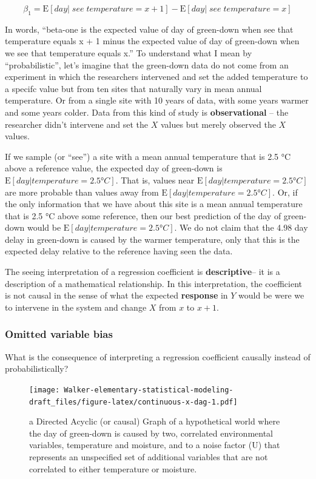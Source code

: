 \documentclass[]{book}
\begin{document}
\begin{equation}
\beta_1 = \textrm{E}[day|\;see\;temperature = x+1] - \textrm{E}[day|\;see \;temperature = x]
\end{equation}

In words, ``beta-one is the expected value of day of green-down when see that temperature equals x + 1 minus the expected value of day of green-down when we see that temperature equals x.'' To understand what I mean by ``probabilistic'', let's imagine that the green-down data do not come from an experiment in which the researchers intervened and set the added temperature to a specifc value but from ten sites that naturally vary in mean annual temperature. Or from a single site with 10 years of data, with some years warmer and some years colder. Data from this kind of study is \textbf{observational} -- the researcher didn't intervene and set the \(X\) values but merely observed the \(X\) values.

If we sample (or ``see'') a site with a mean annual temperature that is 2.5 °C above a reference value, the expected day of green-down is \(\textrm{E}[day|temperature = 2.5 °C]\). That is, values near \(\textrm{E}[day|temperature = 2.5 °C]\) are more probable than values away from \(\textrm{E}[day|temperature = 2.5 °C]\). Or, if the only information that we have about this site is a mean annual temperature that is 2.5 °C above some reference, then our best prediction of the day of green-down would be \(\textrm{E}[day|temperature = 2.5 °C]\). We do not claim that the 4.98 day delay in green-down is caused by the warmer temperature, only that this is the expected delay relative to the reference having seen the data.

The seeing interpretation of a regression coefficient is \textbf{descriptive}-- it is a description of a mathematical relationship. In this interpretation, the coefficient is not causal in the sense of what the expected \textbf{response} in \(Y\) would be were we to intervene in the system and change \(X\) from \(x\) to \(x+1\).

\hypertarget{omitted-variable-bias}{%
\subsubsection{Omitted variable bias}\label{omitted-variable-bias}}

What is the consequence of interpreting a regression coefficient causally instead of probabilistically?

\begin{figure}
\centering
\texttt{[image: Walker-elementary-statistical-modeling-draft\_files/figure-latex/continuous-x-dag-1.pdf]}
\caption{\label{fig:continuous-x-dag}a Directed Acyclic (or causal) Graph of a hypothetical world where the day of green-down is caused by two, correlated environmental variables, temperature and moisture, and to a noise factor (U) that represents an unspecified set of additional variables that are not correlated to either temperature or moisture.}
\end{figure}
\end{document}
